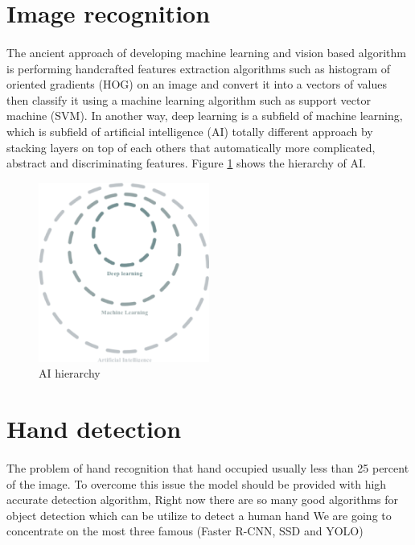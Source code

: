 \documentclass[12pt]{report}
\begin{document}
        \section{Image recognition}
        \paragraph{}
            The ancient approach of developing machine learning and vision based algorithm
            is performing handcrafted features extraction algorithms such as histogram of oriented gradients (HOG) on an image
            and convert it into a vectors of values then classify it using a machine learning algorithm such as support vector machine (SVM).
            In another way, deep learning is a subfield of machine learning, which is subfield of artificial intelligence (AI)
            totally different approach by stacking layers on top of each others that automatically more complicated, abstract 
            and discriminating features. Figure \ref{fig:ai_hierarchy} shows the hierarchy of AI.
            \begin{figure}[h]
                \centering
                \includegraphics[width=0.5\textwidth]{./images/ai_ml_dl.png}
                \caption{AI hierarchy}
                \label{fig:ai_hierarchy}
            \end{figure} 

            \section{Hand detection}
            \paragraph{}
                The problem of hand recognition that hand occupied usually less than 25 percent of the image.
                To overcome this issue the model should be provided with high accurate detection algorithm,
                Right now there are so many good algorithms for object detection which can be utilize to 
                detect a human hand We are going to concentrate on the most three famous (Faster R-CNN, SSD and YOLO)
\end{document}
